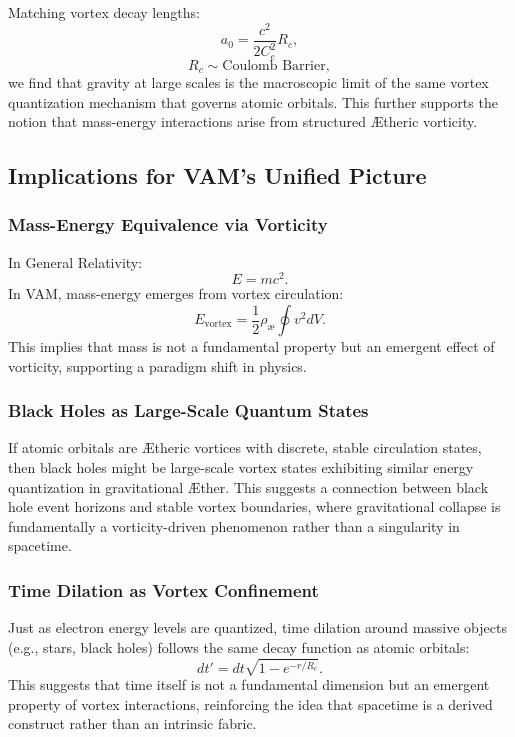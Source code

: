Matching vortex decay lengths:
\begin{equation*}
a_0 = \frac{c^2}{2C_e^2} R_c,
\end{equation*}
\begin{equation*}
R_c \sim \text{Coulomb Barrier},
\end{equation*}
we find that gravity at large scales is the macroscopic limit of the same vortex quantization mechanism that governs atomic orbitals. This further supports the notion that mass-energy interactions arise from structured Ætheric vorticity.


\subsection*{Implications for VAM's Unified Picture}


\subsubsection*{Mass-Energy Equivalence via Vorticity}
In General Relativity:
\begin{equation*}
E = mc^2.
\end{equation*}
In VAM, mass-energy emerges from vortex circulation:
\begin{equation*}
E_\text{vortex} = \frac{1}{2} \rho_\text{\ae} \oint v^2 dV.
\end{equation*}
This implies that mass is not a fundamental property but an emergent effect of vorticity, supporting a paradigm shift in physics.


\subsubsection*{Black Holes as Large-Scale Quantum States}
If atomic orbitals are Ætheric vortices with discrete, stable circulation states, then black holes might be large-scale vortex states exhibiting similar energy quantization in gravitational Æther. This suggests a connection between black hole event horizons and stable vortex boundaries, where gravitational collapse is fundamentally a vorticity-driven phenomenon rather than a singularity in spacetime.


\subsubsection*{Time Dilation as Vortex Confinement}
Just as electron energy levels are quantized, time dilation around massive objects (e.g., stars, black holes) follows the same decay function as atomic orbitals:
\begin{equation*}
dt' = dt \sqrt{1 - e^{-r/R_c}}.
\end{equation*}
This suggests that time itself is not a fundamental dimension but an emergent property of vortex interactions, reinforcing the idea that spacetime is a derived construct rather than an intrinsic fabric.


